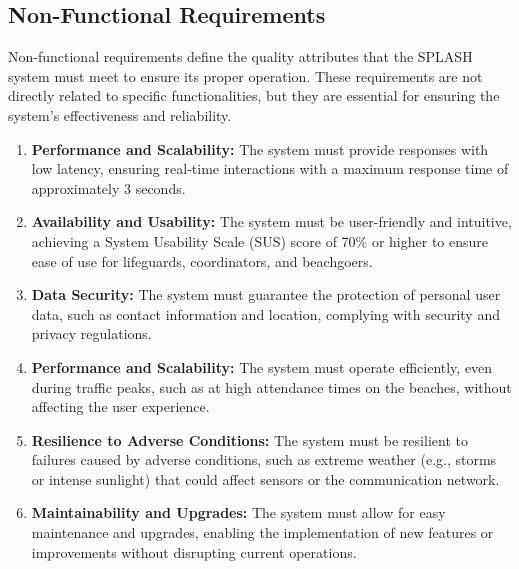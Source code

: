\subsection{Non-Functional Requirements}
\label{section:non_funt_req}
Non-functional requirements define the quality attributes that the SPLASH system must meet to ensure its proper operation. These requirements are not directly related to specific functionalities, but they are essential for ensuring the system’s effectiveness and reliability.
\begin{enumerate}
    \item \textbf{Performance and Scalability:} The system must provide responses with low latency, ensuring real-time interactions with a maximum response time of approximately 3 seconds.
    \item \textbf{Availability and Usability: } The system must be user-friendly and intuitive, achieving a System Usability Scale (SUS) score of 70\% or higher to ensure ease of use for lifeguards, coordinators, and beachgoers.
     \item \textbf{Data Security: }The system must guarantee the protection of personal user data, such as contact information and location, complying with security and privacy regulations.
       \item \textbf{Performance and Scalability: } The system must operate efficiently, even during traffic peaks, such as at high attendance times on the beaches, without affecting the user experience.
        \item \textbf{Resilience to Adverse Conditions: } The system must be resilient to failures caused by adverse conditions, such as extreme weather (e.g., storms or intense sunlight) that could affect sensors or the communication network.
         \item \textbf{Maintainability and Upgrades: }The system must allow for easy maintenance and upgrades, enabling the implementation of new features or improvements without disrupting current operations.
\end{enumerate}


